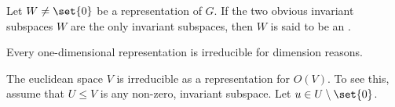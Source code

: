 \begin{definition}
Let $W\neq\set{0}$ be a representation of $G$. If the two obvious invariant subspaces $W$ are the only invariant subspaces, then $W$ is said to be an .
\end{definition}

\begin{example}
Every one-dimensional representation is irreducible for dimension reasons.
\end{example}

\begin{example}
The euclidean space $V$ is irreducible as a representation for $O(V)$. To see this, assume that $U\leq V$ is any non-zero, invariant subspace. Let $u\in U\setminus\set{0}$.
\end{example}

\begin{theorem}

\end{theorem}